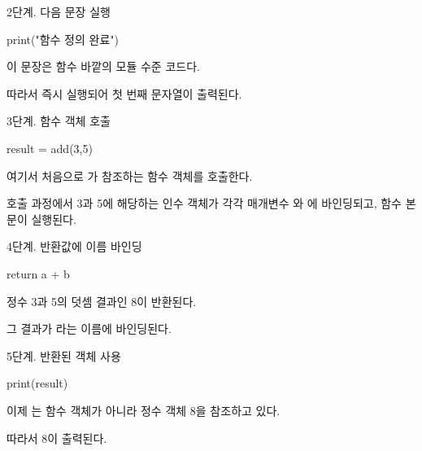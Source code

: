 \begin{dhknote}
\begin{dhksmry}[centered]
2단계. 다음 문장 실행
\end{dhksmry}
\end{dhknote}

\begin{dhkcode}
print("함수 정의 완료")
\end{dhkcode}

이 문장은 함수 바깥의 모듈 수준 코드다.

따라서 즉시 실행되어 첫 번째 문자열이 출력된다.

\begin{dhknote}
\begin{dhksmry}[centered]
3단계. 함수 객체 호출
\end{dhksmry}
\end{dhknote}

\begin{dhkcode}
result = add(3,5)
\end{dhkcode}

여기서 처음으로 가 참조하는 함수 객체를 호출한다.

호출 과정에서 3과 5에 해당하는 인수 객체가 각각 매개변수 와 에 바인딩되고, 함수 본문이 실행된다.

\begin{dhknote}
\begin{dhksmry}[centered]
4단계. 반환값에 이름 바인딩
\end{dhksmry}
\end{dhknote}

\begin{dhkcode}
return a + b
\end{dhkcode}

정수 3과 5의 덧셈 결과인 8이 반환된다.

그 결과가 라는 이름에 바인딩된다.

\begin{dhknote}
\begin{dhksmry}[centered]
5단계. 반환된 객체 사용
\end{dhksmry}
\end{dhknote}

\begin{dhkcode}
print(result)
\end{dhkcode}

이제 는 함수 객체가 아니라 정수 객체 8을 참조하고 있다.

따라서 8이 출력된다.

